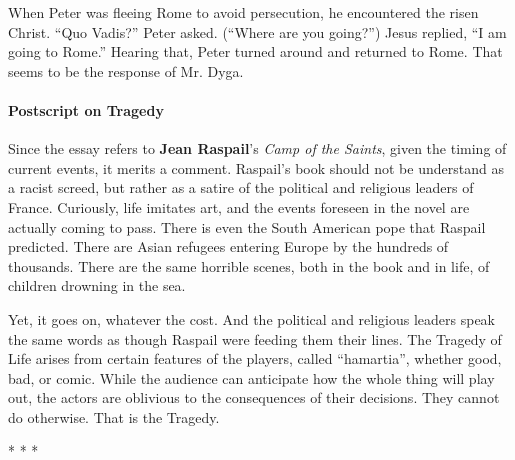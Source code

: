 When Peter was fleeing Rome to avoid persecution, he encountered the risen Christ. ``Quo Vadis?'' Peter asked. (``Where are you going?'') Jesus replied, ``I am going to Rome.'' Hearing that, Peter turned around and returned to Rome. That seems to be the response of Mr. Dyga.

\paragraph{Postscript on Tragedy}


Since the essay refers to \textbf{Jean Raspail}'s \emph{Camp of the Saints}, given the timing of current events, it merits a comment. Raspail's book should not be understand as a racist screed, but rather as a satire of the political and religious leaders of France. Curiously, life imitates art, and the events foreseen in the novel are actually coming to pass. There is even the South American pope that Raspail predicted. There are Asian refugees entering Europe by the hundreds of thousands. There are the same horrible scenes, both in the book and in life, of children drowning in the sea.

Yet, it goes on, whatever the cost. And the political and religious leaders speak the same words as though Raspail were feeding them their lines. The Tragedy of Life arises from certain features of the players, called ``hamartia'', whether good, bad, or comic. While the audience can anticipate how the whole thing will play out, the actors are oblivious to the consequences of their decisions. They cannot do otherwise. That is the Tragedy.



\begin{center}* * *\end{center}

